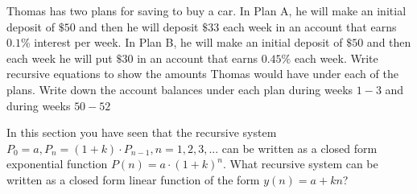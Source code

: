 \documentclass[10pt,]{book}
\theoremstyle{ptxdefinitionnotitle}
\theoremstyle{ptxdefinitiontitle}
\theoremstyle{ptxdefinitionnotitle}
\theoremstyle{ptxdefinitiontitle}
\theoremstyle{ptxdefinitionnotitle}
\theoremstyle{ptxdefinitiontitle}
\numberwithin{equation}{section}
\begin{document}
\begin{divisionexercise}{11}\hypertarget{exercise-30}{}
\hypertarget{p-135}{}%
Thomas has two plans for saving to buy a car.  In Plan A, he will make an initial deposit of \(\$50\) and then he will deposit \(\$33\) each week in an account that earns \(0.1\%\) interest per week.  In Plan B, he will make an initial deposit of \(\$50\) and then each week he will put \(\$30\) in an account that earns \(0.45\%\) each week. Write recursive equations to show the amounts Thomas would have under each of the plans. Write down the account balances under each plan during weeks \(1 - 3\) and during weeks \(50 - 52\)%
\end{divisionexercise}%
\begin{divisionexercise}{12}\hypertarget{exercise-31}{}
\hypertarget{p-136}{}%
In this section you have seen that the recursive system \(P_0=a, P_n=(1+k) \cdot P_{n-1}, n = 1, 2, 3, ...\) can be written as a closed form exponential function \(P(n)=a \cdot (1+k)^n\). What recursive system can be written as a closed form linear function of the form \(y(n)=a+kn\)?%
\end{divisionexercise}%
\typeout{************************************************}
\typeout{************************************************}
\end{document}
